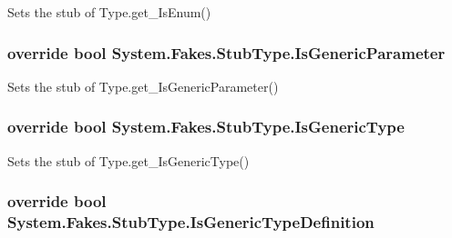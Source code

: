Sets the stub of Type.\-get\-\_\-\-Is\-Enum()

\hypertarget{class_system_1_1_fakes_1_1_stub_type_a166b9faae90eeb343a11204e4c7b54fc}{
\subsubsection[{Is\-Generic\-Parameter}]{\setlength{\rightskip}{0pt plus 5cm}override bool System.\-Fakes.\-Stub\-Type.\-Is\-Generic\-Parameter\hspace{0.3cm}{\ttfamily [get]}}}\label{class_system_1_1_fakes_1_1_stub_type_a166b9faae90eeb343a11204e4c7b54fc}


Sets the stub of Type.\-get\-\_\-\-Is\-Generic\-Parameter()

\hypertarget{class_system_1_1_fakes_1_1_stub_type_a48d5dc4bb69f0a9212d63d922b63d80a}{
\subsubsection[{Is\-Generic\-Type}]{\setlength{\rightskip}{0pt plus 5cm}override bool System.\-Fakes.\-Stub\-Type.\-Is\-Generic\-Type\hspace{0.3cm}{\ttfamily [get]}}}\label{class_system_1_1_fakes_1_1_stub_type_a48d5dc4bb69f0a9212d63d922b63d80a}


Sets the stub of Type.\-get\-\_\-\-Is\-Generic\-Type()

\hypertarget{class_system_1_1_fakes_1_1_stub_type_aec5724340f49b6dfaa181300beeca229}{
\subsubsection[{Is\-Generic\-Type\-Definition}]{\setlength{\rightskip}{0pt plus 5cm}override bool System.\-Fakes.\-Stub\-Type.\-Is\-Generic\-Type\-Definition\hspace{0.3cm}{\ttfamily [get]}}}\label{class_system_1_1_fakes_1_1_stub_type_aec5724340f49b6dfaa181300beeca229}


